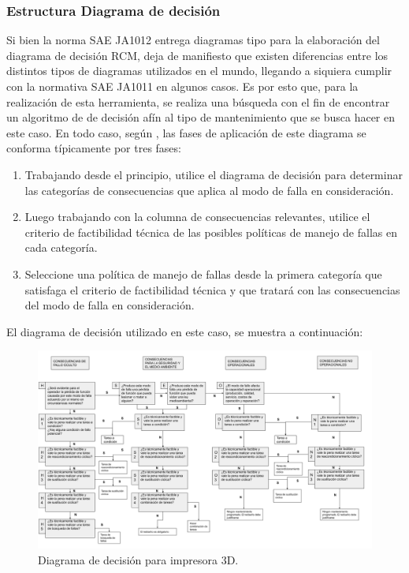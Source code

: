 \subsubsection{Estructura Diagrama de decisión}

Si bien la norma SAE JA1012 entrega diagramas tipo para la elaboración del diagrama de decisión RCM, deja de manifiesto que existen diferencias entre los distintos tipos de diagramas utilizados en el mundo, llegando a siquiera cumplir con la normativa SAE JA1011 en algunos casos. Es por esto que, para la realización de esta herramienta, se realiza una búsqueda con el fin de encontrar un algoritmo de de decisión afín al tipo de mantenimiento que se busca hacer en este caso. En todo caso, según \cite{saeja1012}, las fases de aplicación de este diagrama se conforma típicamente por tres fases:

\begin{enumerate}
\item Trabajando desde el principio, utilice el diagrama de decisión para determinar las categorías de consecuencias que aplica al modo de falla en consideración.
\item Luego trabajando con la columna de consecuencias relevantes, utilice el criterio de factibilidad técnica de las posibles políticas de manejo de fallas en cada categoría.
\item Seleccione una política de manejo de fallas desde la primera categoría que satisfaga el criterio de factibilidad técnica y que tratará con las consecuencias del modo de falla en consideración.

\end{enumerate}

El diagrama de decisión utilizado en este caso, se muestra a continuación:

\begin{figure}[H]
\centering
\includegraphics[scale=0.45, angle=90]{images/decisionrcm.png}
\caption{Diagrama de decisión para impresora 3D.}
\end{figure}


